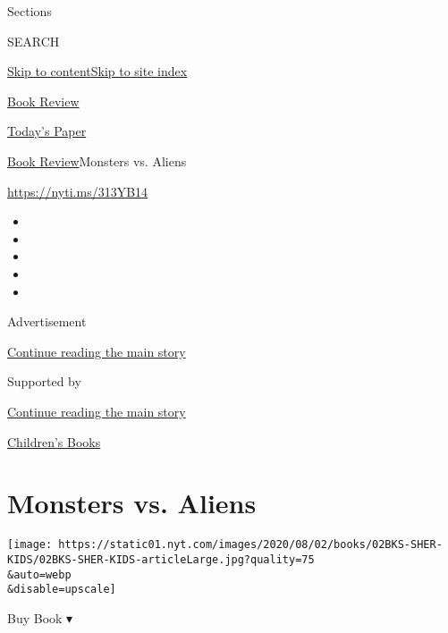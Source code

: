Sections

SEARCH

\protect\hyperlink{site-content}{Skip to
content}\protect\hyperlink{site-index}{Skip to site index}

\href{https://www.nytimes.com/section/books/review}{Book Review}

\href{https://myaccount.nytimes.com/auth/login?response_type=cookie\&client_id=vi}{}

\href{https://www.nytimes.com/section/todayspaper}{Today's Paper}

\href{/section/books/review}{Book Review}\textbar{}Monsters vs. Aliens

\url{https://nyti.ms/313YB14}

\begin{itemize}
\item
\item
\item
\item
\item
\end{itemize}

Advertisement

\protect\hyperlink{after-top}{Continue reading the main story}

Supported by

\protect\hyperlink{after-sponsor}{Continue reading the main story}

\href{/column/childrens-books}{Children's Books}

\hypertarget{monsters-vs-aliens}{%
\section{Monsters vs. Aliens}\label{monsters-vs-aliens}}

\texttt{[image: https://static01.nyt.com/images/2020/08/02/books/02BKS-SHER-KIDS/02BKS-SHER-KIDS-articleLarge.jpg?quality=75\\\&auto=webp\\\&disable=upscale]}

Buy Book ▾

